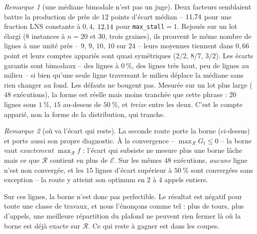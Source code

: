 \documentclass[11pt,a4paper]{article}
\theoremstyle{plain}
\theoremstyle{remark}
\newtheorem{remark}{Remarque}
\newcommand{\Ecal}{\mathcal{E}}
\newcommand{\Rcal}{\mathcal{R}}
\begin{document}
\begin{remark}[une médiane bimodale n'est pas un juge]
Deux facteurs semblaient battre la production de près de $12$ points
d'écart médian -- $11{,}74{}$ pour une fraction LNS constante à
$0{,}4$, $12{,}14{}$ pour \texttt{max\_stall}$=1$. Rejoués sur un lot élargi ($8$ instances à $n=20$ et $30$, trois
graines), ils prouvent le même nombre de lignes à une unité près -- $9$,
$9$, $10$, $10$ sur $24$ -- leurs moyennes tiennent dans $0{,}66$ point et
leurs comptes appariés sont quasi symétriques ($2/2$, $8/7$, $3/2$). Les écarts garantis
sont bimodaux -- des lignes à $0\ \%$, des lignes très haut, peu de lignes
au milieu -- si bien qu'une seule ligne traversant le milieu déplace la
médiane sans rien changer au fond. Les défauts ne bougent pas. Mesurée sur
un lot plus large ($48$ exécutions), la forme est réelle mais moins
tranchée que cette phrase : $20$ lignes sous $1\ \%$, $15$ au-dessus de
$50\ \%$, et \emph{treize} entre les deux. C'est le compte apparié, non la
forme de la distribution, qui tranche.
\end{remark}

\begin{remark}[où va l'écart qui reste]
La seconde route porte la borne (ci-dessus) et porte aussi son propre
diagnostic. À la convergence -- $\max_{\Rcal}G_t\le 0$ -- la borne vaut
\emph{exactement} $\max_{\Rcal}f$ : l'écart qui subsiste ne mesure plus une
borne lâche mais ce que $\Rcal$ contient en plus de $\Ecal$. Sur les mêmes
$48$ exécutions, \emph{aucune} ligne n'est non convergée, et les $15$ lignes
d'écart supérieur à $50\ \%$ sont convergées sans exception -- la route y
atteint son optimum en $2$ à $4$ appels entiers.

Sur ces lignes, la borne n'est donc pas perfectible. Le résultat est
négatif pour toute une classe de travaux, et nous l'énonçons comme tel :
plus de tours, plus d'appels, une meilleure répartition du plafond ne
peuvent rien fermer là où la borne est déjà exacte sur $\Rcal$. Ce qui
reste à gagner est dans les coupes.
\end{remark}
\end{document}
